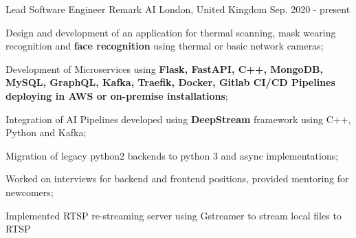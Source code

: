 

\begin{cventries}

   \cventry
    {Lead Software Engineer} %
    {Remark AI} %
    {London,  United Kingdom} %
    {Sep. 2020 - present} %
    {
      \begin{cvitems} %
        \item {Design and development of an application for thermal scanning,
        mask wearing recognition and \textbf{face recognition} using thermal or basic network cameras;}
        \item {Development of Microservices using \textbf{Flask, FastAPI, C++, MongoDB, MySQL, GraphQL, Kafka,
        Traefik, Docker, Gitlab CI/CD Pipelines deploying in AWS or on-premise installations};}
        \item {Integration of AI Pipelines developed using \textbf{DeepStream} framework using C++, Python and Kafka;}
        \item {Migration of legacy python2 backends to python 3 and async implementations;}
        \item {Worked on interviews for backend and frontend positions, provided mentoring for newcomers;}
        \item {Implemented RTSP re-streaming server using Gstreamer to stream local files to RTSP}
      \end{cvitems}
    }


\end{cventries}
